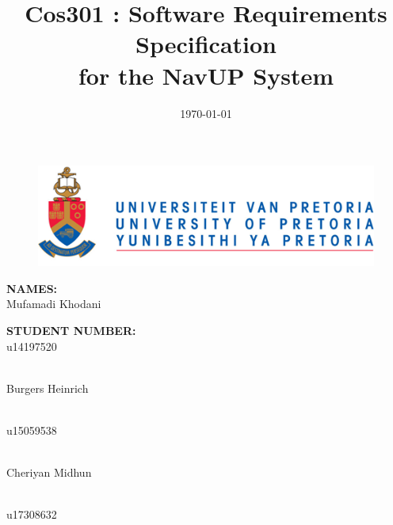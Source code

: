 \documentclass[english]{article}
\title{Cos301 : Software Requirements Specification\\
	for the NavUP System\\
	}
\date{\today}
\begin{document}
	\maketitle
	\begin{figure}[!t]
		\includegraphics{up_logo.png}
	\end{figure}
	\begin{minipage}{0.4\textwidth}
		\begin{flushleft} \large
			\textbf{NAMES:}\\[0.4cm]
			Mufamadi {Khodani}
		\end{flushleft}
	\end{minipage}
	\begin{minipage}{0.4\textwidth}
		\begin{flushright} \large
			\textbf{STUDENT NUMBER:} \\[0.4cm]
			u14197520
		\end{flushright}
	\end{minipage}


	\begin{minipage}{0.4\textwidth}
		\begin{flushleft} \large
			\emph{} \\
			Burgers {Heinrich }
		\end{flushleft}
	\end{minipage}
	\begin{minipage}{0.4\textwidth}
		\begin{flushright} \large
			\emph{} \\
			u15059538
		\end{flushright}
	\end{minipage}


	\begin{minipage}{0.4\textwidth}
		\begin{flushleft} \large
			\emph{} \\
			Cheriyan {Midhun}
		\end{flushleft}
	\end{minipage}
	\begin{minipage}{0.4\textwidth}
		\begin{flushright} \large
			\emph{} \\
			u17308632
		\end{flushright}
	\end{minipage}
\end{document}
